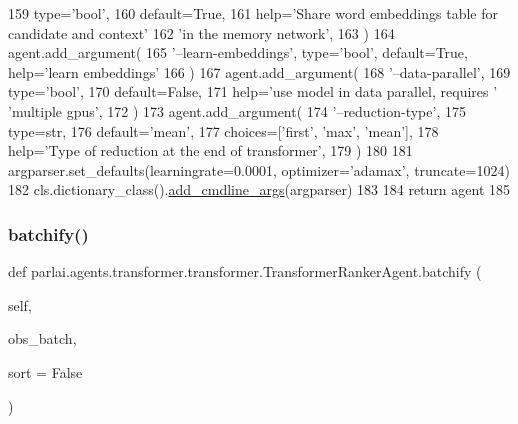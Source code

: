 \begin{DoxyCode}
159             type=\textcolor{stringliteral}{'bool'},
160             default=\textcolor{keyword}{True},
161             help=\textcolor{stringliteral}{'Share word embeddings table for candidate and context'}
162             \textcolor{stringliteral}{'in the memory network'},
163         )
164         agent.add\_argument(
165             \textcolor{stringliteral}{'--learn-embeddings'}, type=\textcolor{stringliteral}{'bool'}, default=\textcolor{keyword}{True}, help=\textcolor{stringliteral}{'learn embeddings'}
166         )
167         agent.add\_argument(
168             \textcolor{stringliteral}{'--data-parallel'},
169             type=\textcolor{stringliteral}{'bool'},
170             default=\textcolor{keyword}{False},
171             help=\textcolor{stringliteral}{'use model in data parallel, requires '} \textcolor{stringliteral}{'multiple gpus'},
172         )
173         agent.add\_argument(
174             \textcolor{stringliteral}{'--reduction-type'},
175             type=str,
176             default=\textcolor{stringliteral}{'mean'},
177             choices=[\textcolor{stringliteral}{'first'}, \textcolor{stringliteral}{'max'}, \textcolor{stringliteral}{'mean'}],
178             help=\textcolor{stringliteral}{'Type of reduction at the end of transformer'},
179         )
180 
181         argparser.set\_defaults(learningrate=0.0001, optimizer=\textcolor{stringliteral}{'adamax'}, truncate=1024)
182         cls.dictionary\_class().\hyperlink{namespaceparlai_1_1agents_1_1drqa_1_1config_a62fdd5554f1da6be0cba185271058320}{add\_cmdline\_args}(argparser)
183 
184         \textcolor{keywordflow}{return} agent
185 
\end{DoxyCode}
\mbox{\label{classparlai_1_1agents_1_1transformer_1_1transformer_1_1TransformerRankerAgent_a2592aa2dc8469ab671656597b4ba48a8}} 
\subsubsection{\texorpdfstring{batchify()}{batchify()}}
{\footnotesize\ttfamily def parlai.\+agents.\+transformer.\+transformer.\+Transformer\+Ranker\+Agent.\+batchify (\begin{DoxyParamCaption}\item[{}]{self,  }\item[{}]{obs\+\_\+batch,  }\item[{}]{sort = {\ttfamily False} }\end{DoxyParamCaption})}

